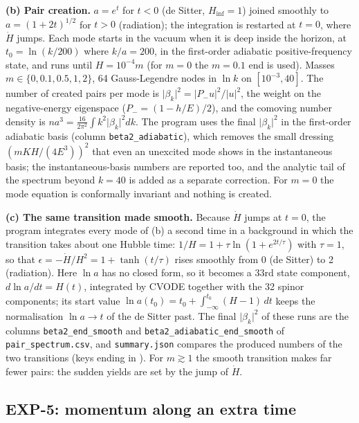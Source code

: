 \documentclass[11pt]{article}
\begin{document}
\textbf{(b) Pair creation.} $a=e^{t}$ for $t<0$ (de Sitter, $H_{\mathrm{inf}}=1$) joined smoothly to $a=(1+2t)^{1/2}$ for $t>0$ (radiation); the integration is restarted at $t=0$, where $\dot H$ jumps. Each mode starts in the vacuum when it is deep inside the horizon, at $t_0=\ln(k/200)$ where $k/a=200$, in the first-order adiabatic positive-frequency state, and runs until $H=10^{-4}m$ (for $m=0$ the $m=0.1$ end is used). Masses $m\in\{0,0.1,0.5,1,2\}$, 64 Gauss-Legendre nodes in $\ln k$ on $[10^{-3},40]$. The number of created pairs per mode is $\lvert\beta_k\rvert^2=\lvert P_-u\rvert^2/\lvert u\rvert^2$, the weight on the negative-energy eigenspace ($P_-=(1-h/E)/2$), and the comoving number density is $na^3=\frac{16}{2\pi^2}\int k^2\lvert\beta_k\rvert^2dk$. The program uses the final $\lvert\beta_k\rvert^2$ in the first-order adiabatic basis (column \texttt{beta2\_ad\allowbreak{}iabatic}), which removes the small dressing $(mKH/(4E^3))^2$ that even an unexcited mode shows in the instantaneous basis; the instantaneous-basis numbers are reported too, and the analytic tail of the spectrum beyond $k=40$ is added as a separate correction. For $m=0$ the mode equation is conformally invariant and nothing is created.

\textbf{(c) The same transition made smooth.} Because $\dot H$ jumps at $t=0$, the program integrates every mode of (b) a second time in a background in which the transition takes about one Hubble time: $1/H=1+\tau\ln(1+e^{2t/\tau})$ with $\tau=1$, so that $\epsilon=-\dot H/H^2=1+\tanh(t/\tau)$ rises smoothly from 0 (de Sitter) to 2 (radiation). Here $\ln a$ has no closed form, so it becomes a 33rd state component, $d\ln a/dt=H(t)$, integrated by CVODE together with the 32 spinor components; its start value $\ln a(t_0)=t_0+\int_{-\infty}^{t_0}(H-1)\,dt$ keeps the normalisation $\ln a\to t$ of the de Sitter past. The final $\lvert\beta_k\rvert^2$ of these runs are the columns \texttt{beta2\_en\allowbreak{}d\_smooth} and \texttt{beta2\_ad\allowbreak{}iabatic\_\allowbreak{}end\_smoo\allowbreak{}th} of \texttt{pair\_spe\allowbreak{}ctrum.cs\allowbreak{}v}, and \texttt{summary.\allowbreak{}json} compares the produced numbers of the two transitions (keys ending in \texttt{}). For $m\gtrsim1$ the smooth transition makes far fewer pairs: the sudden yields are set by the jump of $\dot H$.

\subsection{EXP-5: momentum along an extra time}
\end{document}
